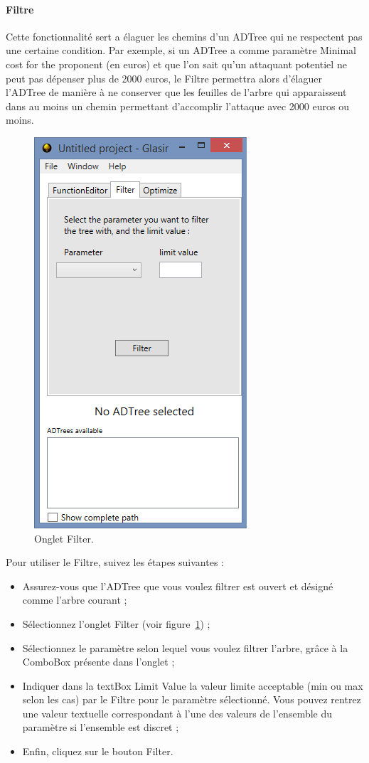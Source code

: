 

\paragraph{Filtre} Cette fonctionnalité sert a élaguer les chemins d'un ADTree qui ne respectent pas une certaine condition. Par exemple, si un ADTree a comme paramètre \og Minimal cost for the proponent \fg (en euros) et que l'on sait qu'un attaquant potentiel ne peut pas dépenser plus de 2000 euros, le Filtre permettra alors d'élaguer l'ADTree de manière à ne conserver que les feuilles de l'arbre qui apparaissent dans au moins un chemin permettant d'accomplir l'attaque avec 2000 euros ou moins.

 \begin{figure}[H]
        \centering
        \includegraphics[height=0.7\textwidth]{figure/filter.png}
        \caption{Onglet Filter.}
        \label{fig:filter}
    \end{figure}

Pour utiliser le Filtre, suivez les étapes suivantes :

\begin{itemize}
\item Assurez-vous que l'ADTree que vous voulez filtrer est ouvert et désigné comme l'arbre courant ;
\item Sélectionnez l'onglet \og Filter \fg{} (voir {\sc figure}~\ref{fig:filter}) ;
\item Sélectionnez le paramètre selon lequel vous voulez filtrer l'arbre, grâce à la ComboBox présente dans l'onglet ;
\item Indiquer dans la textBox \og Limit Value \fg{} la valeur limite acceptable (min ou max selon les cas) par le Filtre pour le paramètre sélectionné. Vous pouvez rentrez une valeur textuelle correspondant à l'une des valeurs de l'ensemble du paramètre si l'ensemble est discret ;
\item Enfin, cliquez sur le bouton \og Filter\fg{}.
\end{itemize}

